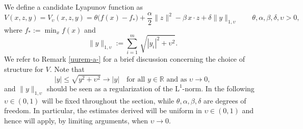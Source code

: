 \documentclass[11pt, a4paper,leqno]{amsart}
\theoremstyle{definition}
\numberwithin{equation}{section}
\begin{document}
We define a candidate Lyapunov function as
\begin{equation}\label{V}
V(x,z,y)=V_\upsilon(x,z,y)
= \theta\bigl(f(x)-f_\ast\bigr) + \frac\alpha2\|z\|^2 - \beta\,x\cdot z + \delta \|y\|_{1,\upsilon}
\qquad \theta,\alpha,\beta,\delta, \upsilon>0,
\end{equation}
where $f_\ast := \min_{x} f(x)$ and  $$\|y\|_{1,\upsilon}:=\sum_{i=1}^m\,\sqrt{|y_i|^2+\upsilon^2}.$$
We refer to Remark \ref{uurem-a-} for a brief discussion concerning the choice of structure for $V$. Note that
$$|y|\leq \sqrt{y^2+\upsilon^2}\to |y|\quad\mbox{for all $y\in\mathbb R$ and as $\upsilon\to 0$}, $$
and $\|y\|_{1,\upsilon}$ should be seen as a regularization of the $\mathrm{L}^1$-norm. In the following $\upsilon\in (0,1)$ will be fixed throughout the section, while $\theta,\alpha,\beta,\delta$ are degrees of freedom. In particular, the estimates derived will be uniform in $\upsilon\in (0,1)$ and hence will apply, by limiting arguments, when $\upsilon\to 0$.
\end{document}
